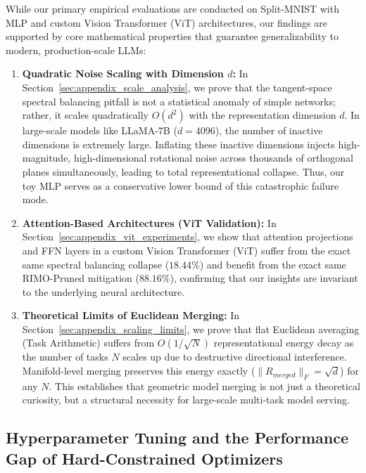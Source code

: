 While our primary empirical evaluations are conducted on Split-MNIST with MLP and custom Vision Transformer (ViT) architectures, our findings are supported by core mathematical properties that guarantee generalizability to modern, production-scale LLMs:
\begin{enumerate}
    \item \textbf{Quadratic Noise Scaling with Dimension $d$:} In Section~\ref{sec:appendix_scale_analysis}, we prove that the tangent-space spectral balancing pitfall is not a statistical anomaly of simple networks; rather, it scales quadratically $O(d^2)$ with the representation dimension $d$. In large-scale models like LLaMA-7B ($d=4096$), the number of inactive dimensions is extremely large. Inflating these inactive dimensions injects high-magnitude, high-dimensional rotational noise across thousands of orthogonal planes simultaneously, leading to total representational collapse. Thus, our toy MLP serves as a conservative lower bound of this catastrophic failure mode.
    \item \textbf{Attention-Based Architectures (ViT Validation):} In Section~\ref{sec:appendix_vit_experiments}, we show that attention projections and FFN layers in a custom Vision Transformer (ViT) suffer from the exact same spectral balancing collapse ($18.44\%$) and benefit from the exact same RIMO-Pruned mitigation ($88.16\%$), confirming that our insights are invariant to the underlying neural architecture.
    \item \textbf{Theoretical Limits of Euclidean Merging:} In Section~\ref{sec:appendix_scaling_limits}, we prove that flat Euclidean averaging (Task Arithmetic) suffers from $O(1/\sqrt{N})$ representational energy decay as the number of tasks $N$ scales up due to destructive directional interference. Manifold-level merging preserves this energy exactly ($\|R_{merged}\|_F = \sqrt{d}$) for any $N$. This establishes that geometric model merging is not just a theoretical curiosity, but a structural necessity for large-scale multi-task model serving.
\end{enumerate}

\subsection{Hyperparameter Tuning and the Performance Gap of Hard-Constrained Optimizers}
\label{subsec:hard_constraints_gap}

